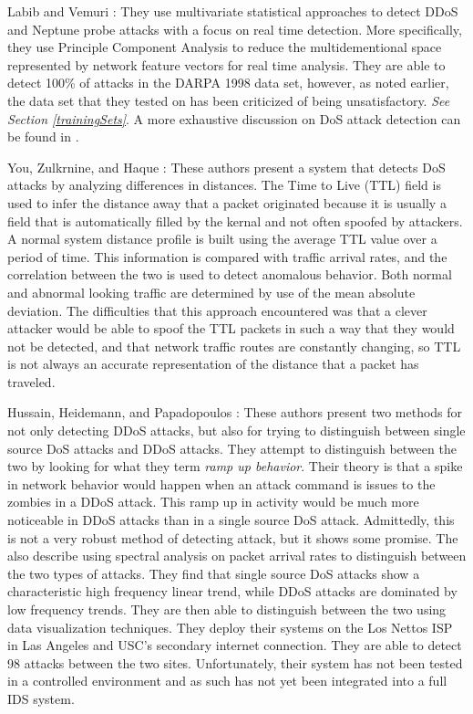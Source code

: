 \documentclass{acm_proc_article-sp}
\begin{document}
		\begin{description}
			\item{Labib and Vemuri \cite{Labib2004}:} They use multivariate statistical approaches to detect DDoS and Neptune probe attacks with a focus on real time detection. More specifically, they use Principle Component Analysis to reduce the multidementional space represented by network feature vectors for real time analysis. They are able to detect 100\% of attacks in the DARPA 1998 data set, however, as noted earlier, the data set that they tested on has been criticized of being unsatisfactory. \emph{See Section \ref{trainingSets}}. A more exhaustive discussion on DoS attack detection can be found in \cite{Alenezi2012}.
			\item{You, Zulkrnine, and Haque \cite{}:} %
			These authors present a system that detects DoS attacks by analyzing differences in distances. The Time to Live (TTL) field is used to infer the distance away that a packet originated because it is usually a field that is automatically filled by the kernal and not often spoofed by attackers. A normal system distance profile is built using the average TTL value over a period of time. This information is compared with traffic arrival rates, and the correlation between the two is used to detect anomalous behavior. Both normal and abnormal looking traffic are determined by use of the mean absolute deviation. The difficulties that this approach encountered was that a clever attacker would be able to spoof the TTL packets in such a way that they would not be detected, and that network traffic routes are constantly changing, so TTL is not always an accurate representation of the distance that a packet has traveled.
			\item{Hussain, Heidemann, and Papadopoulos \cite{Hussain2003}:} These authors present two methods for not only detecting DDoS attacks, but also for trying to distinguish between single source DoS attacks and DDoS attacks. They attempt to distinguish between the two by looking for what they term \emph{ramp up behavior}. Their theory is that a spike in network behavior would happen when an attack command is issues to the zombies in a DDoS attack. This ramp up in activity would be much more noticeable in DDoS attacks than in a single source DoS attack. Admittedly, this is not a very robust method of detecting attack, but it shows some promise. The also describe using spectral analysis on packet arrival rates to distinguish between the two types of attacks. They find that single source DoS attacks show a characteristic high frequency linear trend, while DDoS attacks are dominated by low frequency trends. They are then able to distinguish between the two using data visualization techniques. They deploy their systems on the Los Nettos ISP in Las Angeles and USC's secondary internet connection. They are able to detect 98 attacks between the two sites. Unfortunately, their system has not been tested in a controlled environment and as such has not yet been integrated into a full IDS system.
		\end{description}
  
\end{document}
